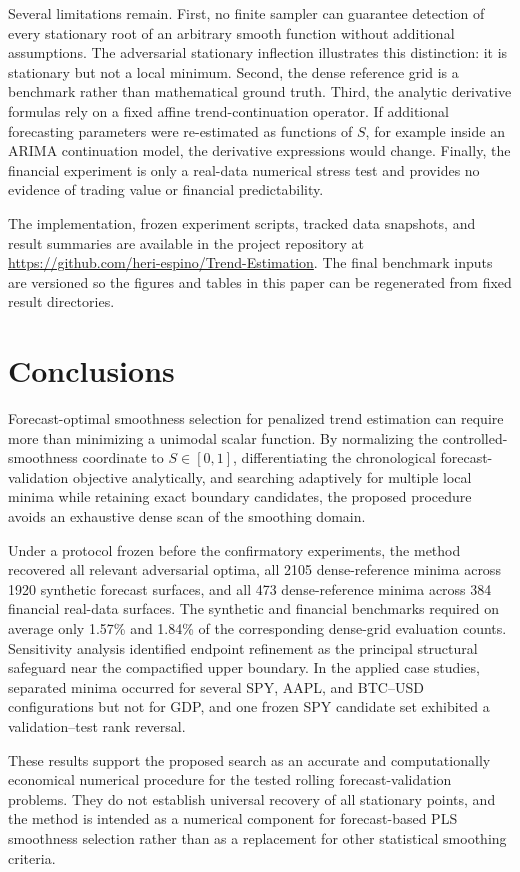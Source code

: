 \documentclass[english]{smcca}
\begin{document}
Several limitations remain. First, no finite sampler can guarantee detection of every stationary root of an arbitrary smooth function without additional assumptions. The adversarial stationary inflection illustrates this distinction: it is stationary but not a local minimum. Second, the dense reference grid is a benchmark rather than mathematical ground truth. Third, the analytic derivative formulas rely on a fixed affine trend-continuation operator. If additional forecasting parameters were re-estimated as functions of \(S\), for example inside an ARIMA continuation model, the derivative expressions would change. Finally, the financial experiment is only a real-data numerical stress test and provides no evidence of trading value or financial predictability.

The implementation, frozen experiment scripts, tracked data snapshots, and result summaries are available in the project repository at \url{https://github.com/heri-espino/Trend-Estimation}. The final benchmark inputs are versioned so the figures and tables in this paper can be regenerated from fixed result directories.

\section{Conclusions}

Forecast-optimal smoothness selection for penalized trend estimation can require more than minimizing a unimodal scalar function. By normalizing the controlled-smoothness coordinate to \(S\in[0,1]\), differentiating the chronological forecast-validation objective analytically, and searching adaptively for multiple local minima while retaining exact boundary candidates, the proposed procedure avoids an exhaustive dense scan of the smoothing domain.

Under a protocol frozen before the confirmatory experiments, the method recovered all relevant adversarial optima, all 2105 dense-reference minima across 1920 synthetic forecast surfaces, and all 473 dense-reference minima across 384 financial real-data surfaces. The synthetic and financial benchmarks required on average only 1.57\% and 1.84\% of the corresponding dense-grid evaluation counts. Sensitivity analysis identified endpoint refinement as the principal structural safeguard near the compactified upper boundary. In the applied case studies, separated minima occurred for several SPY, AAPL, and BTC--USD configurations but not for GDP, and one frozen SPY candidate set exhibited a validation--test rank reversal.

These results support the proposed search as an accurate and computationally economical numerical procedure for the tested rolling forecast-validation problems. They do not establish universal recovery of all stationary points, and the method is intended as a numerical component for forecast-based PLS smoothness selection rather than as a replacement for other statistical smoothing criteria.



\end{document}
